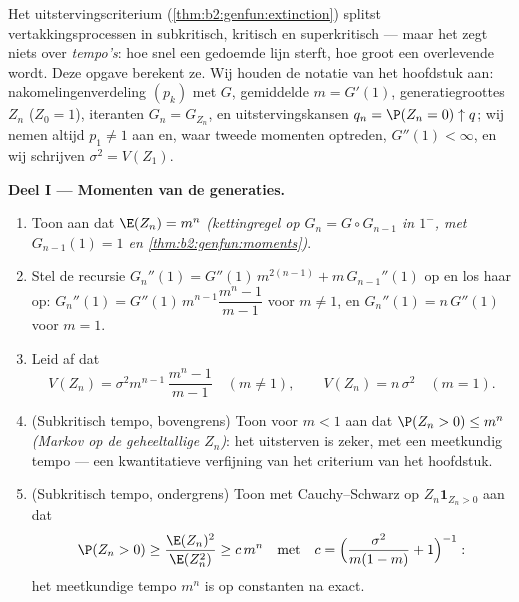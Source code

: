 \begin{problem}\label{pb:b2:genfun:1}
Het uitstervingscriterium (\cref{thm:b2:genfun:extinction})
splitst vertakkingsprocessen in
subkritisch, kritisch en superkritisch --- maar het zegt niets over
\emph{tempo's}: hoe snel een gedoemde lijn sterft, hoe groot een
overlevende wordt. Deze opgave berekent ze. Wij houden de notatie
van het hoofdstuk aan: nakomelingenverdeling $(p_k)$ met
 $G$, gemiddelde $m = G'(1)$,
generatiegroottes $Z_n$ ($Z_0 = 1$), iteranten $G_n = G_{Z_n}$, en
uitstervingskansen $q_n = \P(Z_n = 0) \uparrow q$; wij nemen altijd
$p_1 \neq 1$ aan en, waar tweede momenten optreden, $G''(1) <
\infty$, en wij schrijven $\sigma^2 = V(Z_1)$.

\medskip
\noindent\textbf{Deel I --- Momenten van de generaties.}
\begin{enumerate}
  \item Toon aan dat $\E(Z_n) = m^n$ \emph{(kettingregel op $G_n =
        G \circ G_{n-1}$ in $1^-$, met $G_{n-1}(1) = 1$ en
        \cref{thm:b2:genfun:moments})}.
  \item Stel de recursie $G_n''(1) = G''(1)\,m^{2(n-1)} +
        m\,G_{n-1}''(1)$ op en los haar op: $G_n''(1) =
        G''(1)\,m^{n-1}\dfrac{m^n - 1}{m - 1}$ voor $m \neq 1$, en
        $G_n''(1) = n\,G''(1)$ voor $m = 1$.
  \item Leid af dat
        \[
        V(Z_n) = \sigma^2m^{n-1}\,\frac{m^n - 1}{m - 1}
        \quad (m \neq 1),
        \qquad
        V(Z_n) = n\,\sigma^2 \quad (m = 1).
        \]
  \item (Subkritisch tempo, bovengrens) Toon voor $m < 1$ aan dat
        $\P(Z_n > 0) \leq m^n$ \emph{(Markov op de geheeltallige
        $Z_n$)}: het uitsterven is zeker, met een meetkundig tempo
        --- een kwantitatieve verfijning van het criterium van het
        hoofdstuk.
  \item (Subkritisch tempo, ondergrens) Toon met Cauchy--Schwarz op
        $Z_n\mathbf 1_{Z_n > 0}$ aan dat
        \[
        \P(Z_n > 0) \geq \frac{\E(Z_n)^2}{\E(Z_n^2)}
        \geq c\,m^{n}
        \quad\text{met}\quad
        c = \Bigl(\frac{\sigma^2}{m(1-m)} + 1\Bigr)^{-1} :
        \]
        het meetkundige tempo $m^n$ is op constanten na exact.
\end{enumerate}


\end{problem}
